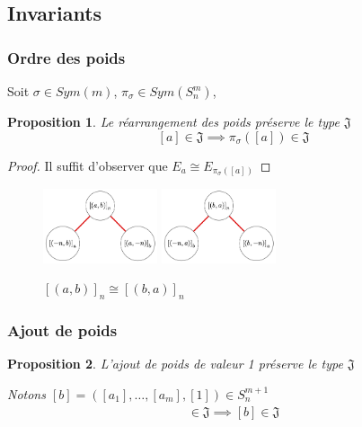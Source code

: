 \documentclass{article}
\newtheorem{proposition}{Proposition}
\begin{document}
\newpage

\subsection{Invariants}

\subsubsection{Ordre des poids}

Soit $\sigma \in Sym(m)$, $\pi_{\sigma} \in Sym(S_n^m)$, 

\begin{proposition}
    Le réarrangement des poids préserve le type $\mathfrak{J}$
    \[ [a] \in \mathfrak{J} \implies \pi_{\sigma}([a]) \in \mathfrak{J} \]
\end{proposition}

\begin{proof}
    Il suffit d'observer que $E_a \cong E_{\pi_{\sigma}([a])}$
\end{proof}

\begin{figure}[h]
    \caption{${[(a, b)]}_n \cong {[(b, a)]}_n$}
    \centering
    \includegraphics[width=0.3\textwidth]{abn}
    \includegraphics[width=0.3\textwidth]{ban}
\end{figure}

\subsubsection{Ajout de poids}

\begin{proposition}
    L'ajout de poids de valeur 1 préserve le type $\mathfrak{J}$

    Notons $[b] = ([a_1], \dots, [a_m], [1]) \in S_n^{m+1}$
    \begin{align*}
        [a] \in \mathfrak{J} \implies [b] \in \mathfrak{J}
    \end{align*}
\end{proposition}
\end{document}
